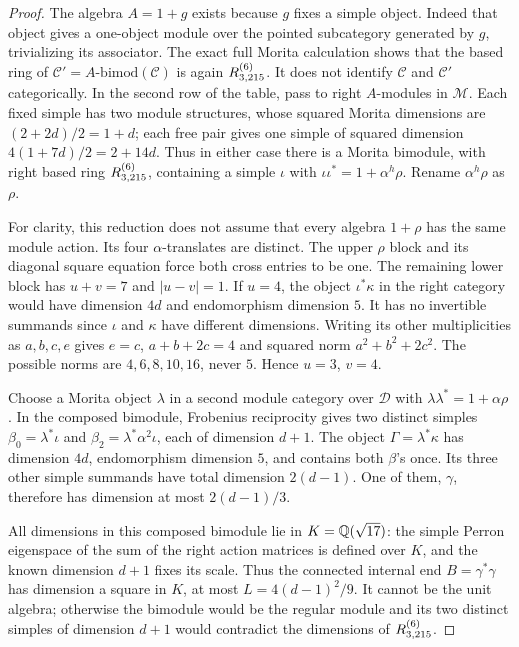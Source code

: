 \begin{proof}
The algebra $A=1+g$ exists because $g$ fixes a simple object. Indeed that
object gives a one-object module over the pointed subcategory generated
by $g$, trivializing its associator. The exact full Morita calculation
shows that the based ring of
$\mathcal C'=A\text{-bimod}(\mathcal C)$ is again $R^{(6)}_{3,215}$.
It does not identify $\mathcal C$ and $\mathcal C'$ categorically.
In the second row of the table, pass to right $A$-modules in
$\mathcal M$. Each fixed simple has two module structures, whose
squared Morita dimensions are $(2+2d)/2=1+d$; each free pair gives one
simple of squared dimension $4(1+7d)/2=2+14d$.
Thus in either case there is a Morita bimodule, with right based ring
$R^{(6)}_{3,215}$, containing a simple $\iota$ with
$\iota\iota^*=1+\alpha^h\rho$. Rename $\alpha^h\rho$ as $\rho$.

For clarity, this reduction does not assume that every algebra
$1+\rho$ has the same module action. Its four $\alpha$-translates are
distinct. The upper $\rho$ block and its diagonal square equation force
both cross entries to be one. The remaining lower block has
$u+v=7$ and $|u-v|=1$. If $u=4$, the object $\iota^*\kappa$ in the
right category would have dimension $4d$ and endomorphism dimension
$5$. It has no invertible summands since $\iota$ and $\kappa$ have
different dimensions. Writing its other multiplicities as $a,b,c,e$
gives $e=c$, $a+b+2c=4$ and squared norm $a^2+b^2+2c^2$.
The possible norms are $4,6,8,10,16$, never $5$. Hence $u=3$, $v=4$.

Choose a Morita object $\lambda$ in a second module category over
$\mathcal D$ with $\lambda\lambda^*=1+\alpha\rho$.
In the composed bimodule, Frobenius reciprocity gives two distinct
simples $\beta_0=\lambda^*\iota$ and
$\beta_2=\lambda^*\alpha^2\iota$, each of dimension $d+1$.
The object $\Gamma=\lambda^*\kappa$ has dimension $4d$, endomorphism
dimension $5$, and contains both $\beta$'s once. Its three other simple
summands have total dimension $2(d-1)$. One of them, $\gamma$, therefore
has dimension at most $2(d-1)/3$.

All dimensions in this composed bimodule lie in $K=\mathbb Q(\sqrt{17})$:
the simple Perron eigenspace of the sum of the right action matrices
is defined over $K$, and the known dimension $d+1$ fixes its scale.
Thus the connected internal end $B=\gamma^*\gamma$ has dimension a
square in $K$, at most $L=4(d-1)^2/9$. It cannot be the unit algebra;
otherwise the bimodule would be the regular module and its two distinct
simples of dimension $d+1$ would contradict the dimensions of
$R^{(6)}_{3,215}$.


\end{proof}
